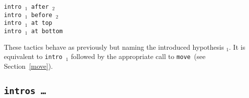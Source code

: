 \begin{coq_example*}
\begin{Variants}
\item {\tt intro \ident$_1$ after \ident$_2$}\\
      {\tt intro \ident$_1$ before \ident$_2$}\\
      {\tt intro \ident$_1$ at top}\\
      {\tt intro \ident$_1$ at bottom}

  These tactics behave as previously but naming the introduced hypothesis
  \ident$_1$.  It is equivalent to {\tt intro \ident$_1$} followed by
  the appropriate call to {\tt move}~(see Section~\ref{move}).

\end{Variants}

\subsection{\tt intros {\intropattern} \mbox{\dots} \intropattern}
\label{intros-pattern}



\end{coq_example*}
